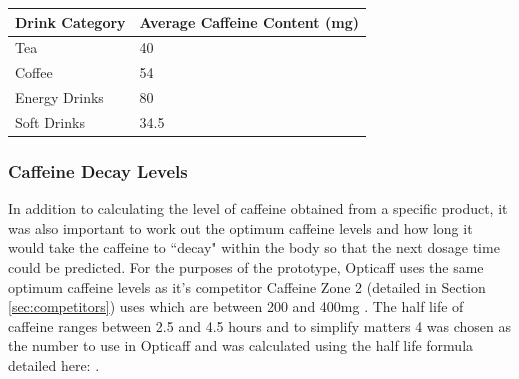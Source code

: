 \begin{center}
\begin{tabular}{|l|l|}
\hline
\textbf{Drink Category} & \textbf{Average Caffeine Content (mg)} \\\hline
Tea & 40 \\\hline
Coffee & 54 \\\hline
Energy Drinks & 80 \\\hline
Soft Drinks & 34.5 \\\hline
\end{tabular}
\end{center}

\subsubsection{Caffeine Decay Levels}
\label{sec:decay}
In addition to calculating the level of caffeine obtained from a specific product, it was also important to work out the optimum caffeine levels and how long it would take the caffeine to ``decay" within the body so that the next dosage time could be predicted. For the purposes of the prototype, Opticaff uses the same optimum caffeine levels as it's competitor Caffeine Zone 2 (detailed in Section \ref{sec:competitors}) uses which are between 200 and 400mg \cite{CaffeineZoneInfo}. The half life of caffeine ranges between 2.5 and 4.5 hours \cite{CaffeinePharmacology} \cite{CaffeinePharmacy} and to simplify matters 4 was chosen as the number to use in Opticaff and was calculated using the half life formula detailed here: \cite{HalfLife}.
 
